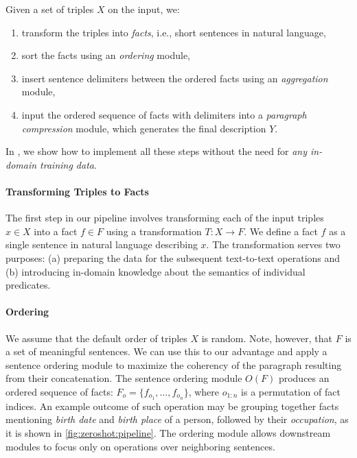Given a set of triples $X$ on the input, we:
\begin{enumerate}
    \item transform the triples into \textit{facts}, i.e., short sentences in natural language,
    \item sort the facts using an \textit{ordering} module,
    \item insert sentence delimiters between the ordered facts using an \textit{aggregation} module,
    \item input the ordered sequence of facts with delimiters into a \textit{paragraph compression} module, which generates the final description $Y$.
\end{enumerate}

In , we show how to implement all these steps without the need for \emph{any in-domain training data}.

\paragraph{Transforming Triples to Facts}

The first step in our pipeline involves transforming each of the input triples $x \in X$ into a fact $f \in F$  using a transformation $T: X \rightarrow F$. We define a fact $f$ as a single sentence in natural language describing $x$.
The transformation serves two purposes: (a) preparing the data for the subsequent text-to-text operations and (b) introducing in-domain knowledge about the semantics of individual predicates.




\paragraph{Ordering} We assume that the default order of triples $X$ is random. Note, however, that $F$ is a set of meaningful sentences. We can use this to our advantage and apply a sentence ordering module \cite{barzilay2001sentence,lapata2003probabilistic} to maximize the coherency of the paragraph resulting from their concatenation. The sentence ordering module $O(F)$ produces an ordered sequence of facts: $F_o = \{f_{o_1}, \ldots, f_{o_n}\}$, where $o_{1:n}$ is a permutation of fact indices. An example outcome of such operation may be grouping together facts mentioning \textit{birth date} and \textit{birth place} of a person, followed by their \textit{occupation}, as it is shown in \autoref{fig:zeroshot:pipeline}. The ordering module allows downstream modules to focus only on operations over neighboring sentences.


